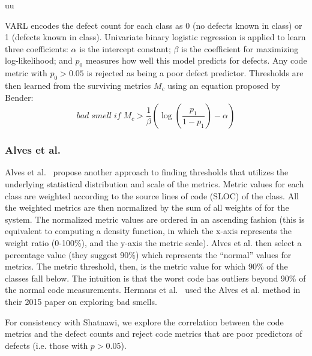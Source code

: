 uu \documentclass[final,twocolumn,5p]{elsarticle}
\theoremstyle{break}
\begin{document}
VARL encodes the defect count
for each class as 0 (no defects known in class) or 1 (defects known in class).
Univariate binary logistic regression is applied to learn three coefficients:  
 $\alpha$ is the intercept constant;
    $\beta$ is the coefficient for maximizing log-likelihood;
  and $p_0$  
    measures   how well this   model predicts for   defects.
Any code metric with $p_0>0.05$ is  rejected as being a poor defect predictor. Thresholds are then learned from the surviving metrics $M_c$ using
an equation proposed by Bender:
\begin{equation}
 \mathit{bad\; smell\; if\;} M_c > \frac{1}{\beta }\left( {\log \left( {\frac{{{p_1}}}{{1 - {p_1}}}} \right) - \alpha } \right) 
\end{equation}

 
\subsubsection{ Alves et al.}
Alves et al.~\cite{Alves2010} propose another approach
to finding thresholds that  utilizes the underlying statistical distribution and scale of the metrics. 
Metric values for each class are weighted according to the source lines of code (SLOC) of the class. All the weighted metrics are then normalized by the sum of all weights of for the system. 
The normalized metric values are ordered in an ascending fashion (this is equivalent to computing a density function, in which the x-axis represents the weight ratio (0-100\%), and the y-axis the metric scale).
Alves et al. then select a percentage value (they suggest 90\%) which represents the ``normal'' values for metrics. The metric threshold, then, is the metric value for which 90\% of the classes fall below. The intuition  is that the worst code has outliers beyond 90\% of the normal code measurements. Hermans et al.~\cite{hermans15} used the
Alves et al. method in their  2015 paper on
exploring bad smells.

For consistency
with Shatnawi, we explore the correlation between
the code metrics and the defect counts and   reject code metrics that are poor predictors of defects (i.e.   those  with $p > 0.05$).
\end{document}
